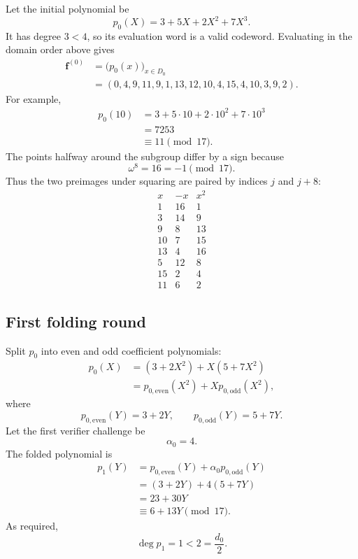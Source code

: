 Let the initial polynomial be
\[
    p_0(X)=3+5X+2X^2+7X^3.
\]
It has degree $3<4$, so its evaluation word is a valid codeword. Evaluating in the domain
order above gives
\[
\begin{aligned}
\mathbf f^{(0)}
&=\bigl(p_0(x)\bigr)_{x\in D_0}\\
&=(0,4,9,11,9,1,13,12,10,4,15,4,10,3,9,2).
\end{aligned}
\]
For example,
\[
\begin{aligned}
p_0(10)
&=3+5\cdot10+2\cdot10^2+7\cdot10^3\\
&=7253\\
&\equiv 11\pmod{17}.
\end{aligned}
\]
The points halfway around the subgroup differ by a sign because
\[
    \omega^8=16=-1\pmod{17}.
\]
Thus the two preimages under squaring are paired by indices $j$ and $j+8$:
\[
\begin{array}{c|c|c}
x & -x & x^2\\
\hline
1 & 16 & 1\\
3 & 14 & 9\\
9 & 8 & 13\\
10 & 7 & 15\\
13 & 4 & 16\\
5 & 12 & 8\\
15 & 2 & 4\\
11 & 6 & 2
\end{array}
\]

\subsection{First folding round}

Split $p_0$ into even and odd coefficient polynomials:
\[
\begin{aligned}
p_0(X)
&=(3+2X^2)+X(5+7X^2)\\
&=p_{0,\mathrm{even}}(X^2)
  +X p_{0,\mathrm{odd}}(X^2),
\end{aligned}
\]
where
\[
    p_{0,\mathrm{even}}(Y)=3+2Y,
    \qquad
    p_{0,\mathrm{odd}}(Y)=5+7Y.
\]
Let the first verifier challenge be
\[
    \alpha_0=4.
\]
The folded polynomial is
\[
\begin{aligned}
p_1(Y)
&=p_{0,\mathrm{even}}(Y)+\alpha_0p_{0,\mathrm{odd}}(Y)\\
&=(3+2Y)+4(5+7Y)\\
&=23+30Y\\
&\equiv 6+13Y\pmod{17}.
\end{aligned}
\]
As required,
\[
    \deg p_1=1<2=\frac{d_0}{2}.
\]

